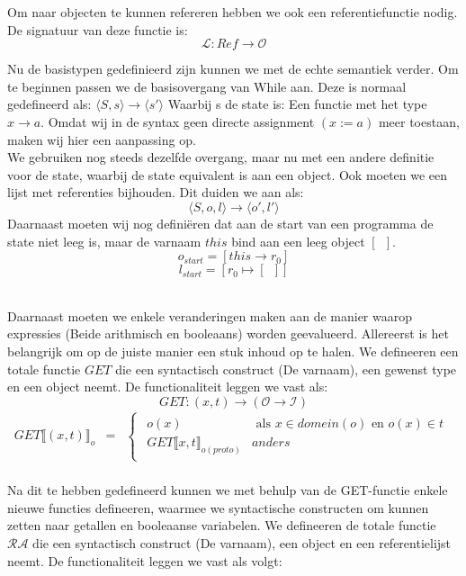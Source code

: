 \documentclass[12pt]{article}
\newcommand{\RA}{\mathcal{RA}}
\begin{document}
Om naar objecten te kunnen refereren hebben we ook een referentiefunctie nodig. De signatuur van deze functie is:
$$\mathcal{L} : Ref \rightarrow \mathcal{O}$$

Nu de basistypen gedefinieerd zijn kunnen we met de echte semantiek verder. Om te beginnen passen we de basisovergang van While aan. Deze is normaal gedefineerd als:
$ \langle S,s \rangle \rightarrow \langle s\prime \rangle $
Waarbij s de state is: Een functie met het type
$ x \rightarrow a $.
Omdat wij in de syntax geen directe assignment $(x := a)$ meer toestaan, maken wij hier een aanpassing op.\\
We gebruiken nog steeds dezelfde overgang, maar nu met een andere definitie voor de state, waarbij de state equivalent is aan een object. Ook moeten we een lijst met referenties bijhouden. Dit duiden we aan als:
$$ \langle S,o,l \rangle \rightarrow \langle o\prime, l\prime \rangle $$
Daarnaast moeten wij nog definiëren dat aan de start van een programma de state niet leeg is, maar de varnaam $ this $ bind aan een leeg object $ [\enspace] $.
$$ o_{start} = [this \rightarrow r_0]$$
$$ l_{start} = [r_0 \mapsto [ \enspace ]]$$
\\
\par
Daarnaast moeten we enkele veranderingen maken aan de manier waarop expressies (Beide arithmisch en booleaans) worden geevalueerd. 
Allereerst is het belangrijk om op de juiste manier een stuk inhoud op te halen. We defineeren een totale functie $ GET $ die een syntactisch construct (De varnaam), een gewenst type en een object neemt. De functionaliteit leggen we vast als:
\[ GET: (x,t) \rightarrow (\mathcal{O} \rightarrow \mathcal{I}) \]
\[
\begin{matrix}
GET\llbracket (x,t) \rrbracket_o & = & 
\begin{cases}
\begin{matrix}
o(x) & \mbox{ als } x \in domein(o) \mbox{ en } o(x) \in t\\
GET\llbracket x,t \rrbracket_{o(proto)} & anders
\end{matrix}
\end{cases}\\
\end{matrix}
\]

Na dit te hebben gedefineerd kunnen we met behulp van de GET-functie enkele nieuwe functies defineeren, waarmee we syntactische constructen om kunnen zetten naar getallen en booleaanse variabelen. We defineeren de totale functie $ \RA $ die een syntactisch construct (De varnaam), een object en een referentielijst neemt. De functionaliteit leggen we vast als volgt:
\end{document}
